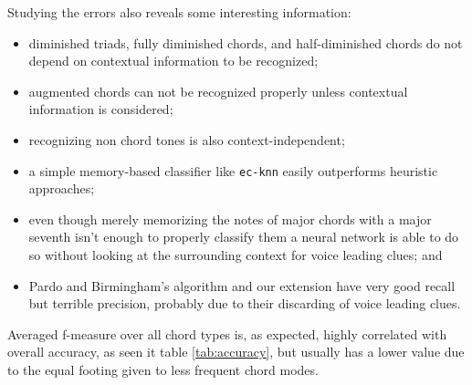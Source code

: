 \documentclass{article}
\begin{document}
Studying the errors also reveals some interesting information:
\begin{itemize}
\item diminished triads, fully diminished chords, and half-diminished
  chords do not depend on contextual information to be recognized;
\item augmented chords can not be recognized properly unless
  contextual information is considered;
\item recognizing non chord tones is also context-independent;
\item a simple memory-based classifier like \texttt{ec-knn}
  easily outperforms heuristic approaches;
\item even though merely memorizing the notes of major chords with a major seventh
  isn't enough to properly classify them a neural network is able to
  do so without looking at the surrounding context for voice leading
  clues; and
\item Pardo and Birmingham's algorithm and our extension have very
  good recall but terrible precision, probably due to their discarding
  of voice leading clues.
\end{itemize}

Averaged f-measure over all chord types is, as expected, highly
correlated with overall accuracy, as seen it table \ref{tab:accuracy},
but usually has a lower value due to the equal footing given to less
frequent chord modes.
\end{document}
